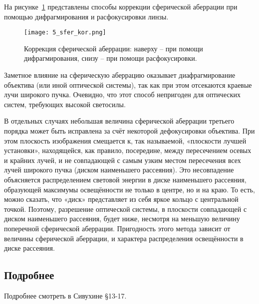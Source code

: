 На рисунке~\ref{korwiki} представлены способы коррекции сферической аберрации при помощью дифрагмирования и расфокусировки линзы. 
\begin{figure}[H]
	\centering
	\texttt{[image: 5\_sfer\_kor.png]}
	\caption{Коррекция сферической аберрации: наверху -- при помощи дифрагмирования, снизу --  при помощи расфокусировки.}
	\label{korwiki}
\end{figure} 
Заметное влияние на сферическую аберрацию оказывает диафрагмирование объектива (или иной оптической системы), так как при этом отсекаются краевые лучи широкого пучка. Очевидно, что этот способ непригоден для оптических систем, требующих высокой светосилы. 

В отдельных случаях небольшая величина сферической аберрации третьего порядка может быть исправлена за счёт некоторой дефокусировки объектива. При этом плоскость изображения смещается к, так называемой, «плоскости лучшей установки», находящейся, как правило, посередине, между пересечением осевых и крайних лучей, и не совпадающей с самым узким местом пересечения всех лучей широкого пучка (диском наименьшего рассеяния). Это несовпадение объясняется распределением световой энергии в диске наименьшего рассеяния, образующей максимумы освещённости не только в центре, но и на краю. То есть, можно сказать, что «диск» представляет из себя яркое кольцо с центральной точкой. Поэтому, разрешение оптической системы, в плоскости совпадающей с диском наименьшего рассеяния, будет ниже, несмотря на меньшую величину поперечной сферической аберрации. Пригодность этого метода зависит от величины сферической аберрации, и характера распределения освещённости в диске рассеяния.
\subsection{Подробнее}
Подробнее смотреть в Сивухине \S 13-17.